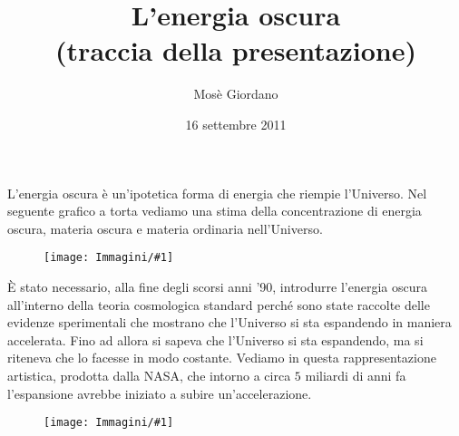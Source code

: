 \documentclass[12pt,a4paper,fleqn,draft]{article}
\title{L'energia oscura\\(traccia della presentazione)}
\author{Mosè Giordano}
\date{16 settembre 2011}
\newcommand{\figura}[1]{
  \begin{figure}[h!]
    \texttt{[image: Immagini/\#1]}
  \end{figure}
}
\begin{document}
\maketitle
L'energia oscura è un'ipotetica forma di energia che riempie l'Universo. Nel
seguente grafico a torta vediamo una stima della concentrazione di energia
oscura, materia oscura e materia ordinaria nell'Universo.
\figura{DarkMatterPie}

È stato necessario, alla fine degli scorsi anni '90, introdurre l'energia oscura
all'interno della teoria cosmologica standard perché sono state raccolte delle
evidenze sperimentali che mostrano che l'Universo si sta espandendo in maniera
accelerata. Fino ad allora si sapeva che l'Universo si sta espandendo, ma si
riteneva che lo facesse in modo costante. Vediamo in questa rappresentazione
artistica, prodotta dalla NASA, che intorno a circa $5$ miliardi di anni fa
l'espansione avrebbe iniziato a subire un'accelerazione.
\figura{800px-CMB_Timeline300_no_WMAP}
\end{document}
